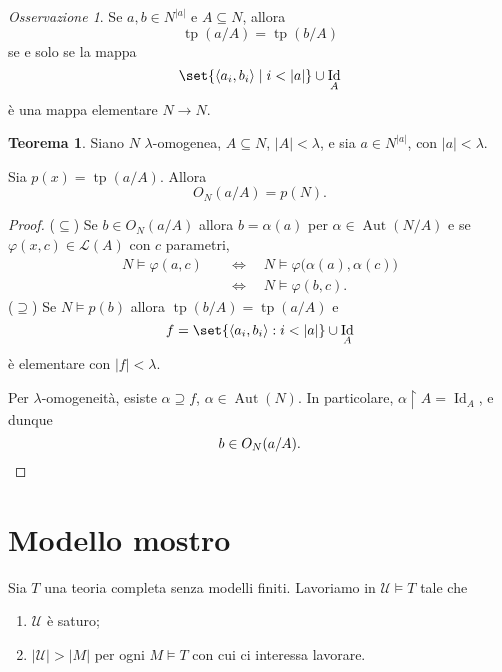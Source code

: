 \documentclass[10pt]{article}
\DeclareMathOperator{\Id}{Id}
\newcommand{\card}[1]{\left\vert #1 \right\vert}
\newcommand{\1}{\mathds{1}}
\theoremstyle{definition}%
\newtheorem{thm}{Teorema}[section]
\theoremstyle{plain}
\theoremstyle{remark}
\newtheorem*{oss}{Osservazione}
\begin{document}
\begin{oss}
Se \(a,b \in N^{|a|}\) e \(A \subseteq N\), allora
\begin{equation*}
\operatorname{tp}(a/A)=\operatorname{tp}(b/A)
\end{equation*}
se e solo se la mappa
\begin{equation*}
\set{\langle a_{i}, b_{i}\rangle\mid i <\card{a}}\cup\Id_{A}
\end{equation*}
è una mappa elementare \(N\to N\).
\end{oss}

\begin{thm}
Siano \(N\) \(\lambda\)-omogenea, \(A \subseteq N\), \(\card{A}<\lambda\), e sia \(a \in N^{|a|}\), con \(|a|<\lambda\).

Sia \(p(x)=\operatorname{tp}(a/A)\). Allora
\begin{equation*}
O_{N}(a/A) = p(N).
\end{equation*}
\end{thm}
\begin{proof}
(\(\subseteq\)) Se \(b \in O_{N}(a/A)\) allora \(b =\alpha(a)\) per \(\alpha \in \operatorname{Aut}(N/A)\) e se \(\varphi(x,c) \in \mathcal{L}(A)\) con \(c\) parametri,
\begin{align*}
N\vDash\varphi(a,c)\quad &\iff\quad N\vDash\varphi\big(\alpha(a),\alpha(c)\big)\\
&\iff\quad N\vDash\varphi(b,c).
\end{align*}
(\(\supseteq\)) Se \(N\vDash p(b)\) allora \(\operatorname{tp}(b/A)=\operatorname{tp}(a/A)\) e
\begin{equation*}
f=\set{\langle a_{i},b_{i}\rangle: i<\card{a}}\cup\Id_{A}
\end{equation*}
è elementare con \(\card{f}<\lambda\).

Per \(\lambda\)-omogeneità, esiste \(\alpha\supseteq f\), \(\alpha \in \operatorname{Aut}(N)\). In particolare, \(\alpha\upharpoonright A =\Id_{A}\), e dunque
\begin{equation*}
b \in O_{N}(a/A).\qedhere
\end{equation*}
\end{proof}
\section{Modello mostro}
\label{sec:orgf7e3714}

Sia \(T\) una teoria completa senza modelli finiti. Lavoriamo in \(\mathcal{U}\vDash T\) tale che
\begin{enumerate}
\item \(\mathcal{U}\) è saturo;
\item \(\card{\mathcal{U}}>\card{M}\) per ogni \(M\vDash T\) con cui ci interessa lavorare.
\end{enumerate}
\end{document}
